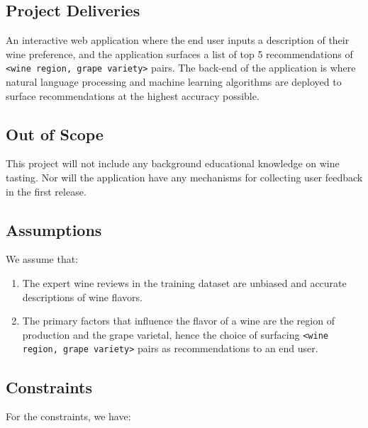 \documentclass[
	a4paper,
	fontsize=10pt, %
	twoside=false, %
	secnumdepth=2, %
]{kaohandt}
\begin{document}
\subsection{Project Deliveries}

An interactive web application where the end user inputs a description of their wine preference, and the application surfaces a list of top 5 recommendations of \texttt{<wine region, grape variety>} pairs. The back-end of the application is where natural language processing and machine learning algorithms are deployed to surface recommendations at the highest accuracy possible.

\subsection{Out of Scope}

This project will not include any background educational knowledge on wine tasting. Nor will the application have any mechanisms for collecting user feedback in the first release.

\subsection{Assumptions}

We assume that:

\begin{enumerate}
	\item The expert wine reviews in the training dataset are unbiased and accurate descriptions of wine flavors.
	\item The primary factors that influence the flavor of a wine are the region of production and the grape varietal, hence the choice of surfacing \texttt{<wine region, grape variety>} pairs as recommendations to an end user.
\end{enumerate}

\subsection{Constraints}

For the constraints, we have:
\end{document}
